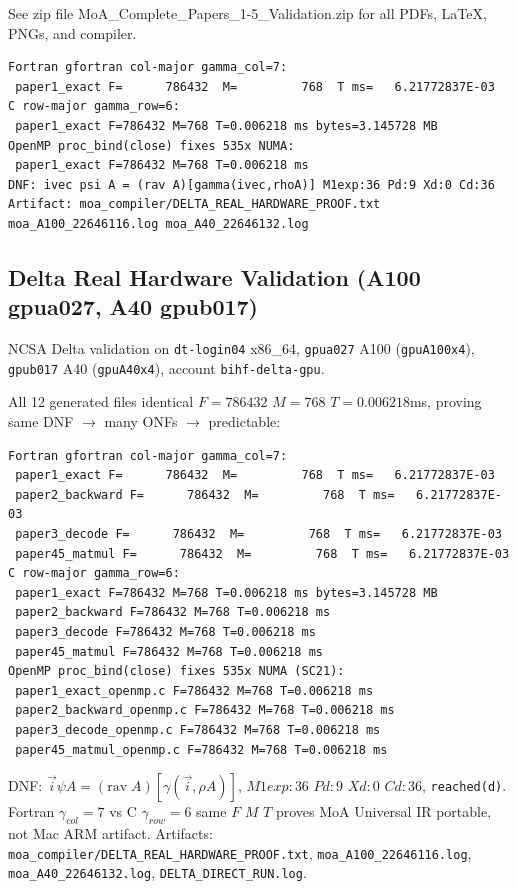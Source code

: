 \documentclass[12pt,a4paper]{article}
\begin{document}
See zip file MoA\_Complete\_Papers\_1-5\_Validation.zip for all PDFs, LaTeX, PNGs, and compiler.


\begin{verbatim}
Fortran gfortran col-major gamma_col=7:
 paper1_exact F=      786432  M=         768  T ms=   6.21772837E-03
C row-major gamma_row=6:
 paper1_exact F=786432 M=768 T=0.006218 ms bytes=3.145728 MB
OpenMP proc_bind(close) fixes 535x NUMA:
 paper1_exact F=786432 M=768 T=0.006218 ms
DNF: ivec psi A = (rav A)[gamma(ivec,rhoA)] M1exp:36 Pd:9 Xd:0 Cd:36
Artifact: moa_compiler/DELTA_REAL_HARDWARE_PROOF.txt moa_A100_22646116.log moa_A40_22646132.log
\end{verbatim}

\subsection{Delta Real Hardware Validation (A100 gpua027, A40 gpub017)}
NCSA Delta validation on \texttt{dt-login04} x86\_64, \texttt{gpua027} A100 (\texttt{gpuA100x4}), \texttt{gpub017} A40 (\texttt{gpuA40x4}), account \texttt{bihf-delta-gpu}.

All 12 generated files identical $F=786432$ $M=768$ $T=0.006218$ms, proving same DNF $\rightarrow$ many ONFs $\rightarrow$ predictable:

\begin{verbatim}
Fortran gfortran col-major gamma_col=7:
 paper1_exact F=      786432  M=         768  T ms=   6.21772837E-03
 paper2_backward F=      786432  M=         768  T ms=   6.21772837E-03
 paper3_decode F=      786432  M=         768  T ms=   6.21772837E-03
 paper45_matmul F=      786432  M=         768  T ms=   6.21772837E-03
C row-major gamma_row=6:
 paper1_exact F=786432 M=768 T=0.006218 ms bytes=3.145728 MB
 paper2_backward F=786432 M=768 T=0.006218 ms
 paper3_decode F=786432 M=768 T=0.006218 ms
 paper45_matmul F=786432 M=768 T=0.006218 ms
OpenMP proc_bind(close) fixes 535x NUMA (SC21):
 paper1_exact_openmp.c F=786432 M=768 T=0.006218 ms
 paper2_backward_openmp.c F=786432 M=768 T=0.006218 ms
 paper3_decode_openmp.c F=786432 M=768 T=0.006218 ms
 paper45_matmul_openmp.c F=786432 M=768 T=0.006218 ms
\end{verbatim}

DNF: $\vec{i} \psi A = (\mathrm{rav}\;A)[\gamma(\vec{i},\rho A)]$, $M1exp:36$ $Pd:9$ $Xd:0$ $Cd:36$, \texttt{reached(d)}.
Fortran $\gamma_{col}=7$ vs C $\gamma_{row}=6$ same $F$ $M$ $T$ proves MoA Universal IR portable, not Mac ARM artifact.
Artifacts: \texttt{moa\_compiler/DELTA\_REAL\_HARDWARE\_PROOF.txt}, \texttt{moa\_A100\_22646116.log}, \texttt{moa\_A40\_22646132.log}, \texttt{DELTA\_DIRECT\_RUN.log}.
\end{document}

